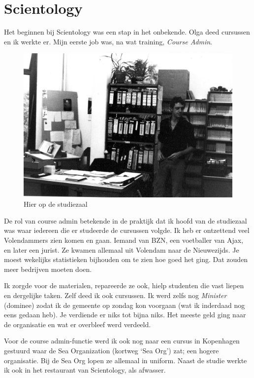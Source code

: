 \documentclass[10pt,twoside, openright]{memoir}
\begin{document}
\section{Scientology} %
\label{cha:scientologu}

Het beginnen bij Scientology was een stap in het onbekende. Olga deed cursussen en ik werkte er. Mijn eerste job was, na wat training, \emph{Course Admin}. 

\begin{figure}
\includegraphics[width=\textwidth]{img/ch44/NZVBwal_0006}
\caption*{\footnotesize Hier op de studiezaal}
\end{figure}

De rol van course admin betekende in de praktijk dat ik hoofd van de studiezaal was waar iedereen die er studeerde de cursussen volgde. Ik heb er ontzettend veel Volendammers zien komen en gaan. Iemand van BZN, een voetballer van Ajax, en later een jurist. Ze kwamen allemaal uit Volendam naar de Nieuwezijds. Je moest wekelijks statistieken bijhouden om te zien hoe goed het ging. Dat zouden meer bedrijven moeten doen.

Ik zorgde voor de materialen, repareerde ze ook, hielp studenten die vast liepen en dergelijke taken. Zelf deed ik ook cursussen. Ik werd zelfs nog \emph{Minister} (dominee) zodat ik de gemeente op zondag kon voorgaan (wat ik inderdaad nog eens gedaan heb). Je verdiende er niks tot bijna niks. Het meeste geld ging naar de organisatie en wat er overbleef werd verdeeld. 

Voor de course admin-functie werd ik ook nog naar een cursus in Kopenhagen gestuurd waar de Sea Organization (kortweg `Sea Org') zat; een hogere organisatie. Bij de Sea Org lopen ze allemaal in uniform. Naast de studie werkte ik ook in het restaurant van Scientology, als afwasser.
\end{document}
